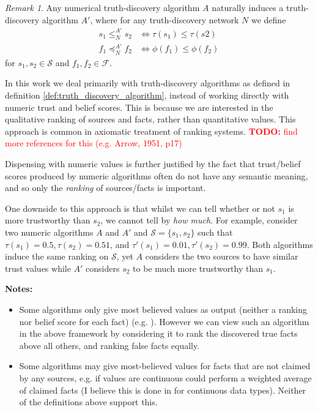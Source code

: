 \documentclass{article}
\theoremstyle{definition}
\theoremstyle{plain}
\theoremstyle{remark}
\newtheorem{remark}{Remark}
\newcommand{\todo}[1] {
    \textcolor{red}{
        \textbf{TODO:} #1
    }
}
\renewcommand{\S}{\mathcal{S}}  %
\newcommand{\F}{\mathcal{F}}
\newcommand{\sle}{\le}
\newcommand{\fle}{\preceq}
\begin{document}
\begin{remark}
    Any numerical truth-discovery algorithm $A$ naturally induces a truth-discovery
    algorithm $A'$, where for any truth-discovery network $N$ we define
    \begin{align*}
    s_1 \sle_N^{A'} s_2 & \iff \tau(s_1) \le \tau(s2) \\
    f_1 \fle_N^{A'} f_2 & \iff \phi(f_1) \le \phi(f_2)
    \end{align*}
    for $s_1, s_2 \in \S$ and $f_1, f_2 \in \F$.

    In this work we deal primarily with truth-discovery algorithms as defined
    in definition \ref{def:truth_discovery_algorithm}, instead of working
    directly with numeric trust and belief scores. This is because we are
    interested in the qualitative ranking of sources and facts, rather than
    quantitative values. This approach is common in axiomatic treatment of
    ranking systems{\cite{altman,altman_personalised}}. \todo{find more
    references for this (e.g. Arrow, 1951, p17)}

    Dispensing with numeric values is further justified by the fact that
    trust/belief scores produced by numeric algorithms often do not have any
    semantic meaning\cite{pasternack}, and so only the \emph{ranking} of
    sources/facts is important.

    One downside to this approach is that whilst we can tell whether or not
    $s_1$ is more trustworthy than $s_2$, we cannot tell by \emph{how much}.
    For example, consider two numeric algorithms $A$ and $A'$ and
    $\S=\{s_1, s_2\}$ such that $\tau(s_1)=0.5, \tau(s_2)=0.51$, and
    $\tau'(s_1)=0.01, \tau'(s_2)=0.99$. Both algorithms induce the same ranking
    on $\S$, yet $A$ considers the two sources to have similar trust values
    while $A'$ considers $s_2$ to be much more trustworthy than $s_1$.

\end{remark}

\textbf{Notes:}
\begin{itemize}

\item Some algorithms only give most believed values as output (neither a
ranking nor belief score for each fact) (e.g. \cite{li_conflicts}). However we
can view such an algorithm in the above framework by considering it to rank the
discovered true facts above all others, and ranking false facts equally.

\item Some algorithms may give most-believed values for facts that are not
claimed by any sources, e.g. if values are continuous could perform a weighted
average of claimed facts (I believe this is done in \cite{li_conflicts} for
continuous data types). Neither of the definitions above support this.

\end{itemize}
\end{document}
